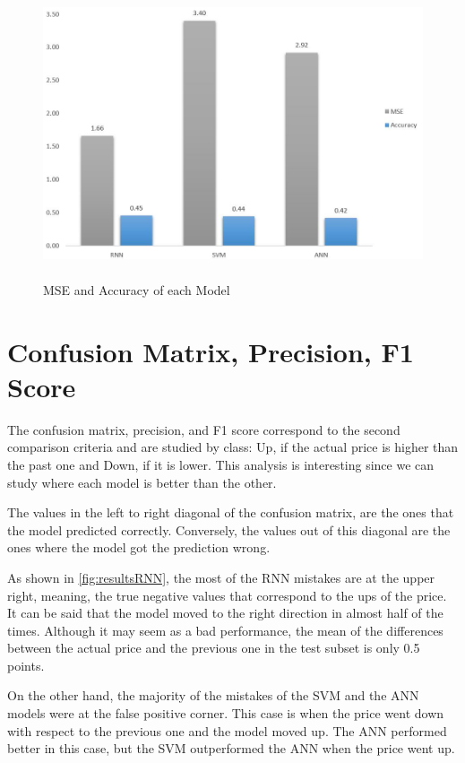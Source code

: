 \begin{figure}
\label{fig:accmse}
\center
\includegraphics[width=13.5cm,height=8.5cm]{Figures/accmseBar.JPG}
\caption{MSE and Accuracy of each Model}
\end{figure}


\section{Confusion Matrix, Precision, F1 Score}

The confusion matrix, precision, and F1 score correspond to the second comparison criteria and are studied by class: Up, if the actual price is higher than the past one and Down, if it is lower. This analysis is interesting since we can study where each model is better than the other. 

The values in the left to right diagonal of the confusion matrix, are the ones that the model predicted correctly. Conversely, the values out of this diagonal are the ones where the model got the prediction wrong.

As shown in \ref{fig:resultsRNN}, the most of the RNN mistakes are at the upper right, meaning, the true negative values that correspond to the ups of the price. It can be said that the model moved to the right direction in almost half of the times. Although it may seem as a bad performance, the mean of the differences between the actual price and the previous one in the test subset is only 0.5 points. 

On the other hand, the majority of the mistakes of the SVM and the ANN models were at the false positive corner. This case is when the price went down with respect to the previous one and the model moved up. The ANN performed better in this case, but the SVM outperformed the ANN when the price went up.

